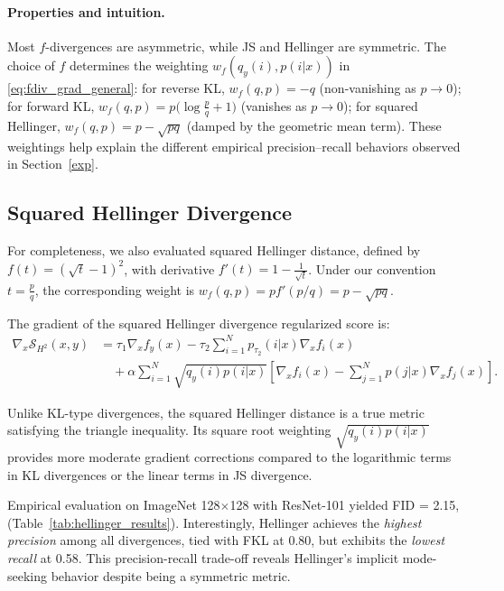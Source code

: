 \documentclass{article}
\begin{document}
\paragraph{Properties and intuition.}
Most $f$-divergences are asymmetric, while JS and Hellinger are symmetric.
The choice of $f$ determines the weighting $w_f(q_y(i),p(i|x))$ in \eqref{eq:fdiv_grad_general}:
for reverse KL, $w_f(q,p)=-q$ (non-vanishing as $p\to 0$);
for forward KL, $w_f(q,p)=p\big(\log\frac{p}{q}+1\big)$ (vanishes as $p\to 0$);
for squared Hellinger, $w_f(q,p)=p-\sqrt{pq}$ (damped by the geometric mean term).
These weightings help explain the different empirical precision--recall behaviors observed in Section~\ref{exp}.

\subsection{Squared Hellinger Divergence}
\label{app:hellinger}

For completeness, we also evaluated squared Hellinger distance, defined by
$f(t) = (\sqrt{t} - 1)^2$, with derivative $f'(t)=1-\frac{1}{\sqrt{t}}$.
Under our convention $t=\frac{p}{q}$, the corresponding weight is
$w_f(q,p)=p f'(p/q)=p-\sqrt{pq}$.

\begin{corollary}
\label{cor:hellinger_gradient}
The gradient of the squared Hellinger divergence regularized score is:
\begin{equation}
\begin{aligned}
\nabla_x \mathcal{S}_{H^2}(x, y) &= \tau_1 \nabla_x f_y(x) - \tau_2 \sum_{i=1}^N p_{\tau_2}(i|x) \nabla_x f_i(x) \\
&\quad + \alpha \sum_{i=1}^N \sqrt{q_y(i)p(i|x)} \left[\nabla_x f_i(x) - \sum_{j=1}^N p(j|x) \nabla_x f_j(x)\right].
\end{aligned}
\label{eq:hellinger_gradient}
\end{equation}
\end{corollary}

Unlike KL-type divergences, the squared Hellinger distance is a true metric satisfying the triangle inequality. Its square root weighting $\sqrt{q_y(i)p(i|x)}$ provides more moderate gradient corrections compared to the logarithmic terms in KL divergences or the linear terms in JS divergence.

Empirical evaluation on ImageNet 128$\times$128 with ResNet-101 yielded FID = 2.15, (Table~\ref{tab:hellinger_results}). Interestingly, Hellinger achieves the \emph{highest precision} among all divergences, tied with FKL at 0.80, but exhibits the \emph{lowest recall} at 0.58. This precision-recall trade-off reveals Hellinger's implicit mode-seeking behavior despite being a symmetric metric.
\end{document}
